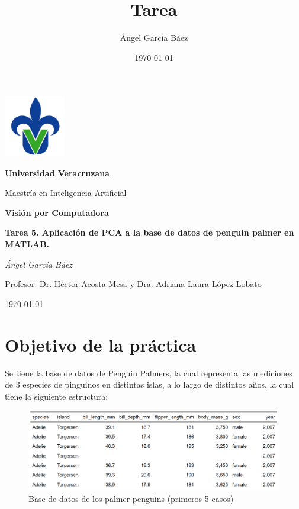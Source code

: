 \documentclass[11pt, letterpaper]{article}
\title{\bfseries Tarea}
\author{Ángel García Báez}
\date{\today}
\begin{document}
	
	\begin{titlepage}
		\centering
		\includegraphics[width=0.2\textwidth]{logo.png}\par
		\vspace{1cm}
		{\LARGE \bfseries Universidad Veracruzana \par}
		\vspace{1cm}
		{\Large Maestría en Inteligencia Artificial\par}
		\vspace{3cm}
		{\LARGE \bfseries Visión por Computadora \par}
		\vspace{1cm}
		{\Large \bfseries Tarea 5. Aplicación de PCA a la base de datos de penguin palmer en MATLAB. \par}
		\vfill
		{\Large \textit{Ángel García Báez}\par}
		\vspace{1cm}
		{\Large Profesor: Dr. Héctor Acosta Mesa y Dra. Adriana Laura López Lobato\par}
		\vfill
		{\Large \today \par}
	\end{titlepage}
	
	\newpage
	\tableofcontents
	\newpage
	
\section{Objetivo de la práctica}
	
Se tiene la base de datos de Penguin Palmers, la cual representa las mediciones de 3 especies de pinguinos en distintas islas, a lo largo de distintos años, la cual tiene la siguiente estructura:




\begin{figure}[h!]
	\centering
	\begin{minipage}{1\textwidth}
		\centering
		\includegraphics[width=\textwidth]{IMG/T1.png}
		\caption{Base de datos de los palmer penguins (primeros 5 casos)}
		\label{fig:f1}
	\end{minipage}\hfill
\end{figure}
\end{document}
